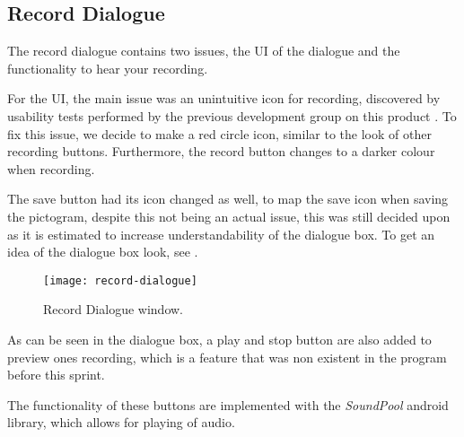 \subsection{Record Dialogue}
The record dialogue contains two issues, the UI of the dialogue and the functionality to hear your recording.

For the UI, the main issue was an unintuitive icon for recording, discovered by usability tests performed by the previous development group on this product \citep{misc:crocold}. To fix this issue, we decide to make a red circle icon, similar to the look of other recording buttons. Furthermore, the record button changes to a darker colour when recording. 

The save button had its icon changed as well, to map the save icon when saving the pictogram, despite this not being an actual issue, this was still decided upon as it is estimated to increase understandability of the dialogue box.
To get an idea of the dialogue box look, see .

\begin{figure}[h]
     \centering
     \texttt{[image: record-dialogue]}
     \caption{Record Dialogue window.}
     \label{fig:record-dialogue}
\end{figure}

As can be seen in the dialogue box, a play and stop button are also added to preview ones recording, which is a feature that was non existent in the program before this sprint.

The functionality of these buttons are implemented with the \textit{SoundPool} android library, which allows for playing of audio.

